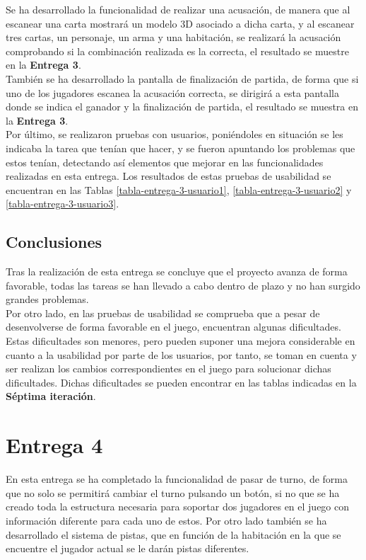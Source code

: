 Se ha desarrollado la funcionalidad de realizar una acusación, de manera que al escanear una carta mostrará un modelo 3D asociado a dicha carta, y al escanear tres cartas, un personaje, un arma y una habitación, se realizará la acusación comprobando si la combinación realizada es la correcta, el resultado se muestre en la \textbf{Entrega 3}.\\

También se ha desarrollado la pantalla de finalización de partida, de forma que si uno de los jugadores escanea la acusación correcta, se dirigirá a esta pantalla donde se indica el ganador y la finalización de partida, el resultado se muestra en la \textbf{Entrega 3}.\\

Por último, se realizaron pruebas con usuarios, poniéndoles en situación se les indicaba la tarea que tenían que hacer, y se fueron apuntando los problemas que estos tenían, detectando así elementos que mejorar en las funcionalidades realizadas en esta entrega. Los resultados de estas pruebas de usabilidad se encuentran en las Tablas \ref{tabla-entrega-3-usuario1}, \ref{tabla-entrega-3-usuario2} y \ref{tabla-entrega-3-usuario3}.


\subsection{Conclusiones}
Tras la realización de esta entrega se concluye que el proyecto avanza de forma favorable, todas las tareas se han llevado a cabo dentro de plazo y no han surgido grandes problemas.\\

Por otro lado, en las pruebas de usabilidad se comprueba que a pesar de desenvolverse de forma favorable en el juego, encuentran algunas dificultades. Estas dificultades son menores, pero pueden suponer una mejora considerable en cuanto a la usabilidad por parte de los usuarios, por tanto, se toman en cuenta y ser realizan los cambios correspondientes en el juego para solucionar dichas dificultades. Dichas dificultades se pueden encontrar en las tablas indicadas en la \textbf{Séptima iteración}.

\newpage

\section{Entrega 4}
En esta entrega se ha completado la funcionalidad de pasar de turno, de forma que no solo se permitirá cambiar el turno pulsando un botón, si no que se ha creado toda la estructura necesaria para soportar dos jugadores en el juego con información diferente para cada uno de estos. Por otro lado también se ha desarrollado el sistema de pistas, que en función de la habitación en la que se encuentre el jugador actual se le darán pistas diferentes.\\

